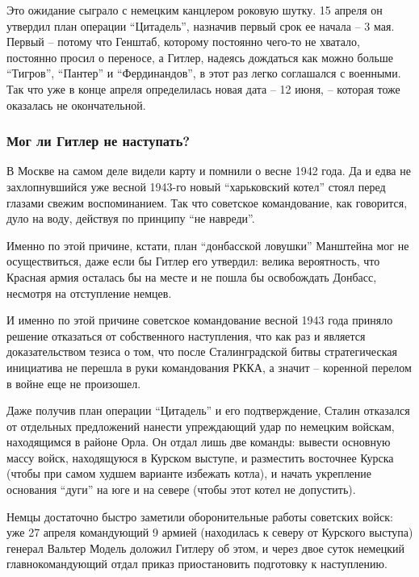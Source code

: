 Это ожидание сыграло с немецким канцлером роковую шутку. 15 апреля он утвердил
план операции \enquote{Цитадель}, назначив первый срок ее начала – 3 мая. Первый –
потому что Генштаб, которому постоянно чего-то не хватало, постоянно просил о
переносе, а Гитлер, надеясь дождаться как можно больше \enquote{Тигров}, \enquote{Пантер} и
\enquote{Фердинандов}, в этот раз легко соглашался с военными. Так что уже в конце
апреля определилась новая дата – 12 июня, – которая тоже оказалась не
окончательной.

\subsubsection{Мог ли Гитлер не наступать?}

В Москве на самом деле видели карту и помнили о весне 1942 года. Да и едва не
захлопнувшийся уже весной 1943-го новый \enquote{харьковский котел} стоял перед глазами
свежим воспоминанием. Так что советское командование, как говорится, дуло на
воду, действуя по принципу \enquote{не навреди}.

Именно по этой причине, кстати, план \enquote{донбасской ловушки} Манштейна мог не
осуществиться, даже если бы Гитлер его утвердил: велика вероятность, что
Красная армия осталась бы на месте и не пошла бы освобождать Донбасс, несмотря
на отступление немцев.

И именно по этой причине советское командование весной 1943 года приняло
решение отказаться от собственного наступления, что как раз и является
доказательством тезиса о том, что после Сталинградской битвы стратегическая
инициатива не перешла в руки командования РККА, а значит – коренной перелом в
войне еще не произошел.

Даже получив план операции \enquote{Цитадель} и его подтверждение, Сталин отказался от
отдельных предложений нанести упреждающий удар по немецким войскам, находящимся
в районе Орла. Он отдал лишь две команды: вывести основную массу войск,
находящуюся в Курском выступе, и разместить восточнее Курска (чтобы при самом
худшем варианте избежать котла), и начать укрепление основания \enquote{дуги} на юге и
на севере (чтобы этот котел не допустить).

Немцы достаточно быстро заметили оборонительные работы советских войск: уже 27
апреля командующий 9 армией (находилась к северу от Курского выступа) генерал
Вальтер Модель доложил Гитлеру об этом, и через двое суток немецкий
главнокомандующий отдал приказ приостановить подготовку к наступлению.

